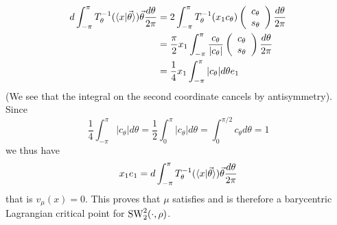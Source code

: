 \begin{align}
     d\int_{-\pi}^{\pi} T^{-1}_\theta(\langle x|\vec{\theta}\rangle) \vec{\theta} \frac{d\theta}{2\pi}
     &= 2\int_{-\pi}^{\pi} T^{-1}_\theta(x_1 c_\theta) \left( \begin{array}{c} c_\theta \\ s_\theta\end{array} \right) \frac{d\theta}{2\pi} \\
     &= \frac{\pi}{2} x_1 \int_{-\pi}^{\pi} \frac{c_\theta}{|c_\theta|} \left( \begin{array}{c} c_\theta \\ s_\theta\end{array} \right) \frac{d\theta}{2\pi} \\
     &= \frac{1}{4} x_1 \int_{-\pi}^{\pi} |c_\theta| d\theta e_1
\end{align}
(We see that the integral on the second coordinate cancels by antisymmetry). Since 
\begin{equation}
    \frac{1}{4} \int_{-\pi}^{\pi} |c_\theta| d\theta = \frac{1}{2} \int_0^\pi |c_\theta| d\theta = \int_0^{\pi/2} c_\theta d\theta = 1
\end{equation}
we thus have
\begin{equation} x_1 e_1 = d\int_{-\pi}^{\pi} T^{-1}_\theta(\langle x|\vec{\theta}\rangle) \vec{\theta} \frac{d\theta}{2\pi} \end{equation}
that is $v_\mu(x) = 0$. This proves that $\mu$ satisfies  and is therefore a barycentric Lagrangian critical point for $\mathop{\mathrm{SW}}\nolimits^2_2(\cdot,\rho)$. \\

